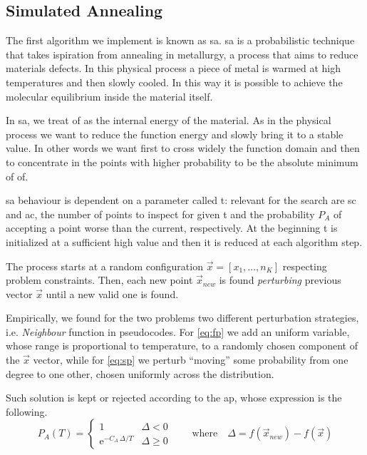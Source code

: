 \documentclass[12pt,journal,draftclsnofoot,onecolumn]{IEEEtran}
\begin{document}
\clearpage
\subsection{Simulated Annealing}
The first algorithm we implement is known as \gls{sa}.
\gls{sa} is a probabilistic technique that takes ispiration from annealing in metallurgy, a process that aims to reduce materials defects.
In this physical process a piece of metal is warmed at high temperatures and then slowly cooled. In this way it is possible to achieve the molecular equilibrium inside the material itself.

In \gls{sa}, we treat \gls{of} as the internal energy of the material.
As in the physical process we want to reduce the function energy and slowly bring it to a stable value. In other words we want first to cross widely the function domain and then to concentrate in the points with higher probability to be the absolute minimum of \gls{of}.

\gls{sa} behaviour is dependent on a parameter called \gls{t}: relevant for the search are \gls{sc} and \gls{ac}, the number of points to inspect for given \gls{t} and the probability $P_A$ of accepting a point worse than the current, respectively. At the beginning \gls{t} is initialized at a sufficient high value and then it is reduced at each algorithm step.

The process starts at a random configuration $\vec{x} = [x_1, \ldots, n_K]$ respecting problem constraints.
Then, each new point $\vec{x}_{new}$ is found \emph{perturbing} previous vector $\vec{x}$ until a new valid one is found.

Empirically, we found for the two problems two different perturbation strategies, i.e. \emph{Neighbour} function in pseudocodes.
For \autoref{eq:fp} we add an uniform variable, whose range is proportional to temperature, to a randomly chosen component of the $\vec{x}$ vector, while for \autoref{eq:sp} we perturb ``moving'' some probability from one degree to one other, chosen uniformly across the distribution.


Such solution is kept or rejected according to the \gls{ap}, whose expression is the following.
\begin{equation*} \label{accept_prob}
	P_A(T) = \begin{cases}
		1 & \Delta < 0 \\
		\mathrm{e}^{ - C_A \, \Delta / T }
		& \Delta \geq 0
	\end{cases}
	\quad \quad \text{where} \quad \Delta = f(\vec{x}_{new})-f (\vec{x})
\end{equation*}
\end{document}
